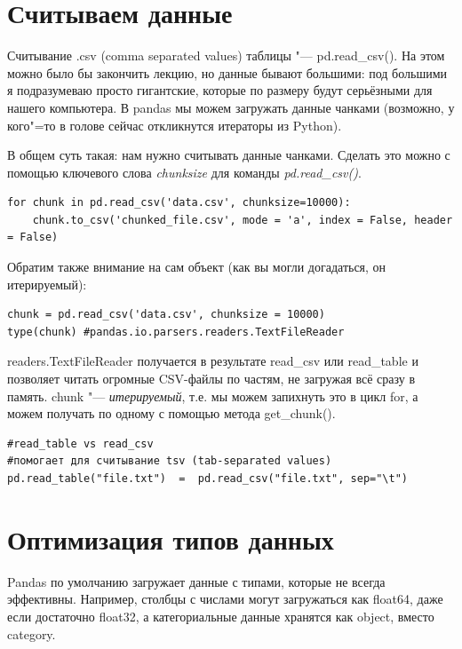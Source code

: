 \documentclass{article}
\begin{document}
\section*{Считываем данные}
Считывание .csv (comma separated values) таблицы "--- pd.read\_csv(). На этом можно было бы закончить лекцию, но данные бывают большими: под большими я подразумеваю просто гигантские, которые по размеру будут серьёзными для нашего компьютера. В pandas мы можем загружать данные чанками (возможно, у кого"=то в голове сейчас откликнутся итераторы из Python). 

В общем суть такая: нам нужно считывать данные чанками. Сделать это можно с помощью ключевого слова \textit{chunksize} для команды \textit{pd.read\_csv()}.

\begin{verbatim}
for chunk in pd.read_csv('data.csv', chunksize=10000):
    chunk.to_csv('chunked_file.csv', mode = 'a', index = False, header = False)
\end{verbatim}

Обратим также внимание на сам объект (как вы могли догадаться, он итерируемый):
\begin{verbatim}
chunk = pd.read_csv('data.csv', chunksize = 10000)
type(chunk) #pandas.io.parsers.readers.TextFileReader
\end{verbatim}

readers.TextFileReader получается в результате read\_csv или read\_table и позволяет читать огромные CSV-файлы по частям, не загружая всё сразу в память. chunk "--- \textit{итерируемый}, т.е. мы можем запихнуть это в цикл for, а можем получать по одному с помощью метода get\_chunk().

\begin{verbatim}
#read_table vs read_csv
#помогает для считывание tsv (tab-separated values)
pd.read_table("file.txt")  =  pd.read_csv("file.txt", sep="\t")
\end{verbatim}

\section*{Оптимизация типов данных}
Pandas по умолчанию загружает данные с типами, которые не всегда эффективны. Например, столбцы с числами могут загружаться как float64, даже если достаточно float32, а категориальные данные хранятся как object, вместо category.
\end{document}
